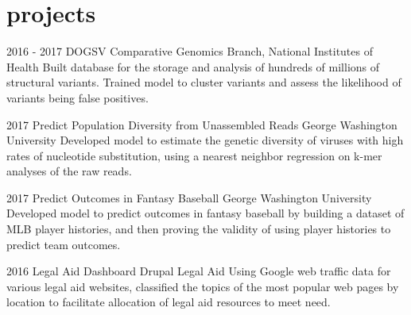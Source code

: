 \documentclass[]{friggeri-cv}
\begin{document}
\section{projects}

\begin{entrylist}
  \entry
    {2016 - 2017}
    {DOGSV}
    {Comparative Genomics Branch, National Institutes of Health}
    {Built database for the storage and analysis of hundreds of millions of structural variants. Trained model to cluster variants and assess the likelihood of variants being false positives.}
    \vspace{2pt}
    
  \entry
    {2017}
    {Predict Population Diversity from Unassembled Reads} 
    {George Washington University}
    {Developed model to estimate the genetic diversity of viruses with high rates of nucleotide substitution, using a nearest neighbor regression on k-mer analyses of the raw reads.}
    \vspace{2pt}
    
    \entry
    {2017}
    {Predict Outcomes in Fantasy Baseball} 
    {George Washington University}
    {Developed model to predict outcomes in fantasy baseball by building a dataset of MLB player histories, and then proving the validity of using player histories to predict team outcomes.}
    \vspace{2pt}

  \entry
    {2016}
    {Legal Aid Dashboard} 
    {Drupal Legal Aid}
    {Using Google web traffic data for various legal aid websites, classified the topics of the most popular web pages by location to facilitate allocation of legal aid resources to meet need.}
    \vspace{-8mm} 
\end{entrylist}
\vspace{-20mm} 
\end{document}
